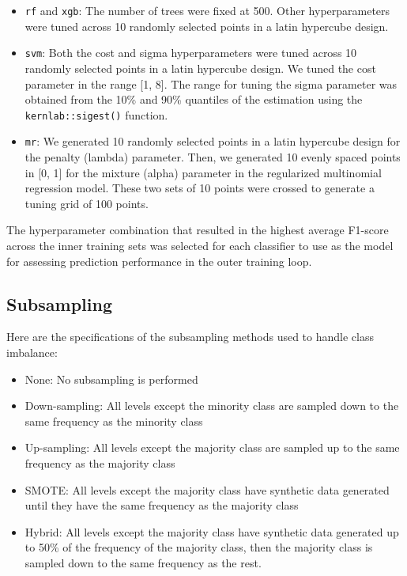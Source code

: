 \documentclass[
]{report}
\providecommand{\tightlist}{%
  \setlength{\itemsep}{0pt}\setlength{\parskip}{0pt}}
\begin{document}
\begin{itemize}
\tightlist
\item
  \texttt{rf} and \texttt{xgb}: The number of trees were fixed at 500. Other hyperparameters were tuned across 10 randomly selected points in a latin hypercube design.
\item
  \texttt{svm}: Both the cost and sigma hyperparameters were tuned across 10 randomly selected points in a latin hypercube design. We tuned the cost parameter in the range {[}1, 8{]}. The range for tuning the sigma parameter was obtained from the 10\% and 90\% quantiles of the estimation using the \texttt{kernlab::sigest()} function.
\item
  \texttt{mr}: We generated 10 randomly selected points in a latin hypercube design for the penalty (lambda) parameter. Then, we generated 10 evenly spaced points in {[}0, 1{]} for the mixture (alpha) parameter in the regularized multinomial regression model. These two sets of 10 points were crossed to generate a tuning grid of 100 points.
\end{itemize}

The hyperparameter combination that resulted in the highest average F1-score across the inner training sets was selected for each classifier to use as the model for assessing prediction performance in the outer training loop.

\subsection{Subsampling}\label{subsampling}

Here are the specifications of the subsampling methods used to handle class imbalance:

\begin{itemize}
\tightlist
\item
  None: No subsampling is performed
\item
  Down-sampling: All levels except the minority class are sampled down to the same frequency as the minority class
\item
  Up-sampling: All levels except the majority class are sampled up to the same frequency as the majority class
\item
  SMOTE: All levels except the majority class have synthetic data generated until they have the same frequency as the majority class
\item
  Hybrid: All levels except the majority class have synthetic data generated up to 50\% of the frequency of the majority class, then the majority class is sampled down to the same frequency as the rest.
\end{itemize}
\end{document}
